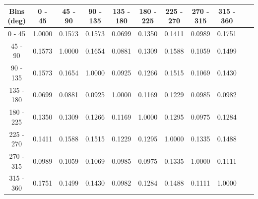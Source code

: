 \documentclass[aps, prd, reprint,showpacs,  preprintnumbers,amsmath,amssymb,superscriptaddress, nofootinbib]{revtex4-1}
\makeatletter
\renewenvironment{table}
  {\def\@captype{table}}
  {}
\makeatother
\begin{document}
\begin{table}
\begin{tabular}{ccccccccccc}
\hline
    Bins (deg) &       0 - 45 &      45 - 90 &     90 - 135 &    135 - 180 &    180 - 225 &    225 - 270 &    270 - 315 &    315 - 360 \\ 
\hline
   0 -  45  & 1.0000  & 0.1573  & 0.1573  & 0.0699  & 0.1350  & 0.1411  & 0.0989  & 0.1751 \\
  45 -  90  & 0.1573  & 1.0000  & 0.1654  & 0.0881  & 0.1309  & 0.1588  & 0.1059  & 0.1499 \\
  90 - 135  & 0.1573  & 0.1654  & 1.0000  & 0.0925  & 0.1266  & 0.1515  & 0.1069  & 0.1430 \\
 135 - 180  & 0.0699  & 0.0881  & 0.0925  & 1.0000  & 0.1169  & 0.1229  & 0.0985  & 0.0982 \\
 180 - 225  & 0.1350  & 0.1309  & 0.1266  & 0.1169  & 1.0000  & 0.1295  & 0.0975  & 0.1284 \\
 225 - 270  & 0.1411  & 0.1588  & 0.1515  & 0.1229  & 0.1295  & 1.0000  & 0.1335  & 0.1488 \\
 270 - 315  & 0.0989  & 0.1059  & 0.1069  & 0.0985  & 0.0975  & 0.1335  & 1.0000  & 0.1111 \\
 315 - 360  & 0.1751  & 0.1499  & 0.1430  & 0.0982  & 0.1284  & 0.1488  & 0.1111  & 1.0000 \\
\hline
\hline
\end{tabular}
\caption{Correlation matrix for bins of $d\sigma/d\phi$.\\
NOTE: Result is for the $\Delta$-enriched subsample with $T_{p}>100$\,MeV and $W<1.4$\,GeV.}

\label{tb:piz-azimuth-cov}
\end{table}
\vspace{1cm}

\end{document}
